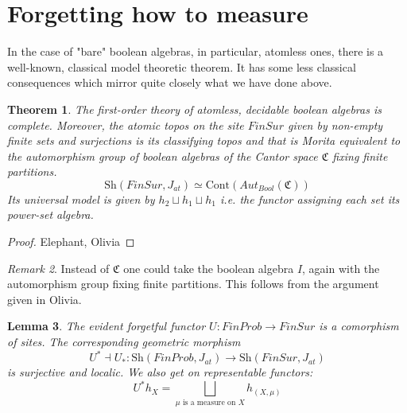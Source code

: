 \documentclass[a4paper]{amsproc}
\theoremstyle{plain}
\newtheorem{theorem}{Theorem}[section]
\newtheorem{lemma}[theorem]{Lemma}
\theoremstyle{definition}
\theoremstyle{remark}
\newtheorem{remark}[theorem]{Remark}
\numberwithin{equation}{section}
\begin{document}
\section{Forgetting how to measure}
In the case of "bare" boolean algebras, in particular, atomless ones, there is a well-known, classical model theoretic theorem. It has some less classical consequences which mirror quite closely what we have done above.
\begin{theorem} The first-order theory of atomless, decidable boolean algebras is complete. Moreover, the atomic topos on the site  $FinSur$ given by non-empty finite sets and surjections is its classifying topos and that is Morita equivalent to the automorphism group of boolean algebras of the Cantor space $\mathfrak{C}$ fixing finite partitions.
\[ \text{Sh}(FinSur, J_{at})\simeq \text{Cont}(Aut_{Bool}(\mathfrak{C}))\]
Its universal model is given by $h_2\sqcup h_1 \sqcup h_1$ i.e. the functor assigning each set its power-set algebra.
\end{theorem}
\begin{proof}Elephant, Olivia
\end{proof}
\begin{remark} Instead of $\mathfrak{C}$ one could take the boolean algebra $I$, again with the automorphism group fixing finite partitions. This follows from the argument given in Olivia.
\end{remark}
\begin{lemma} The evident forgetful functor $U: FinProb\rightarrow FinSur$ is a comorphism of sites. The corresponding geometric morphism 
\[U^*\dashv U_*: \text{Sh}(FinProb, J_{at})\rightarrow  \text{Sh}(FinSur, J_{at})\]
 is surjective and localic. We also get on representable functors:
 \[U^*h_X=\bigsqcup_{\mu\text{ is a measure on }X}h_{(X,\mu)}\]
\end{lemma}
\end{document}

